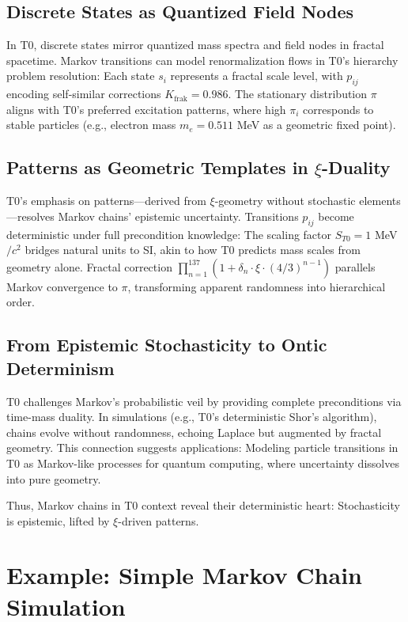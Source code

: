 	\subsection{Discrete States as Quantized Field Nodes}
	In T0, discrete states mirror quantized mass spectra and field nodes in fractal spacetime. Markov transitions can model renormalization flows in T0's hierarchy problem resolution: Each state $s_i$ represents a fractal scale level, with $p_{ij}$ encoding self-similar corrections $K_{\text{frak}} = 0.986$. The stationary distribution $\pi$ aligns with T0's preferred excitation patterns, where high $\pi_i$ corresponds to stable particles (e.g., electron mass $m_e = 0.511$ MeV as a geometric fixed point).
	
	\subsection{Patterns as Geometric Templates in $\xi$-Duality}
	T0's emphasis on patterns—derived from $\xi$-geometry without stochastic elements—resolves Markov chains' epistemic uncertainty. Transitions $p_{ij}$ become deterministic under full precondition knowledge: The scaling factor $S_{T0} = 1$ MeV$/c^2$ bridges natural units to SI, akin to how T0 predicts mass scales from geometry alone. Fractal correction $\prod_{n=1}^{137} (1 + \delta_n \cdot \xi \cdot (4/3)^{n-1})$ parallels Markov convergence to $\pi$, transforming apparent randomness into hierarchical order.
	
	\subsection{From Epistemic Stochasticity to Ontic Determinism}
	T0 challenges Markov's probabilistic veil by providing complete preconditions via time-mass duality. In simulations (e.g., T0's deterministic Shor's algorithm), chains evolve without randomness, echoing Laplace but augmented by fractal geometry. This connection suggests applications: Modeling particle transitions in T0 as Markov-like processes for quantum computing, where uncertainty dissolves into pure geometry.
	
	Thus, Markov chains in T0 context reveal their deterministic heart: Stochasticity is epistemic, lifted by $\xi$-driven patterns.
	
	\section{Example: Simple Markov Chain Simulation}
	
